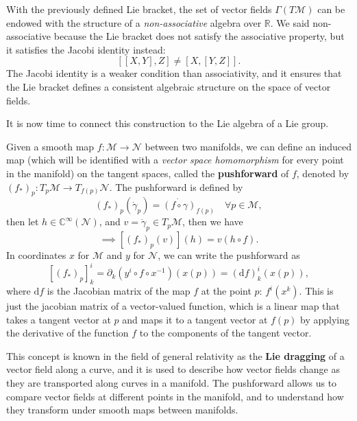 \begin{corollary}
    With the previously defined Lie bracket, the set of vector fields \(\Gamma(T\mathcal{M})\) can be endowed with the structure of a \textit{non-associative} algebra over \(\mathbb{R}\). We said non-associative because the Lie bracket does not satisfy the associative property, but it satisfies the Jacobi identity instead:
    \[
        [[X,Y],Z] \neq [X,[Y,Z]].
    \]
    The Jacobi identity is a weaker condition than associativity, and it ensures that the Lie bracket defines a consistent algebraic structure on the space of vector fields.
\end{corollary}

It is now time to connect this construction to the Lie algebra of a Lie group.

\begin{definition}
    Given a smooth map \(f : \mathcal{M} \to \mathcal{N}\) between two manifolds, we can define an induced map (which will be identified with a \textit{vector space homomorphism} for every point in the manifold) on the tangent spaces, called the \textbf{pushforward} of \(f\), denoted by \((f_*)_p : T_p \mathcal{M} \to T_{f(p)} \mathcal{N}\). The pushforward is defined by
    \[
        (f_*)_p (\dot{\gamma}_p) = \dot{(f \circ \gamma)}_{f(p)} \quad \forall p \in \mathcal{M},
    \]
    then let \(h \in \mathbb{C}^{\infty}(\mathcal{N})\), and \(v = \dot{\gamma}_p \in T_p\mathcal{M}\), then we have
    \[
        \implies \left[(f_*)_p(v)\right](h) = v(h \circ f).
    \]
    In coordinates \(x\) for \(\mathcal{M}\) and \(y\) for \(\mathcal{N}\), we can write the pushforward as
    \[
        [(f_*)_p]^i_k = \partial_k (y^i \circ f \circ x^{-1})(x(p)) = (\mathrm{d} f)^i_k (x(p)),
    \]
    where \(\mathrm{d} f\) is the Jacobian matrix of the map \(f\) at the point \(p\): \(f^i(x^k)\). This is just the jacobian matrix of a vector-valued function, which is a linear map that takes a tangent vector at \(p\) and maps it to a tangent vector at \(f(p)\) by applying the derivative of the function \(f\) to the components of the tangent vector.
\end{definition}

This concept is known in the field of general relativity as the \textbf{Lie dragging} of a vector field along a curve, and it is used to describe how vector fields change as they are transported along curves in a manifold. The pushforward allows us to compare vector fields at different points in the manifold, and to understand how they transform under smooth maps between manifolds.


